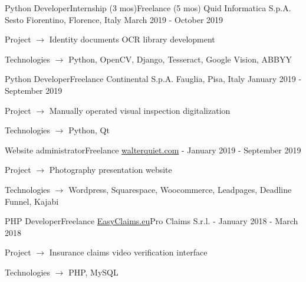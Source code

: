 
\begin{cventries}

  \cventry
    {Python Developer{\enskip\cdotp\enskip}Internship (3 mos){\enskip\cdotp\enskip}Freelance (5 mos)}
    {Quid Informatica S.p.A.}
    {Sesto Fiorentino, Florence, Italy}
    {March 2019 - October 2019}
    {
      \begin{cvitems}
        \item {Project $\rightarrow$ Identity documents OCR library development}
        \item {Technologies $\rightarrow$ Python, OpenCV, Django, Tesseract, Google Vision, ABBYY}
      \end{cvitems}
    }

  \cventry
    {Python Developer{\enskip\cdotp\enskip}Freelance}
    {Continental S.p.A.}
    {Fauglia, Pisa, Italy}
    {January 2019 - September 2019}
    {
      \begin{cvitems}
        \item {Project $\rightarrow$ Manually operated visual inspection digitalization}
        \item {Technologies $\rightarrow$ Python, Qt}
      \end{cvitems}
    }

  \cventry
    {Website administrator{\enskip\cdotp\enskip}Freelance}
    {\href{https://www.walterquiet.com}{walterquiet.com}}
    {-}
    {January 2019 - September 2019}
    {
      \begin{cvitems}
        \item {Project $\rightarrow$ Photography presentation website}
        \item {Technologies $\rightarrow$ Wordpress, Squarespace, Woocommerce, Leadpages, Deadline Funnel, Kajabi}
      \end{cvitems}
    }

  \cventry
    {PHP Developer{\enskip\cdotp\enskip}Freelance}
    {\href{https://www.easyclaims.eu}{EasyClaims.eu}{\enskip\cdotp\enskip}Pro Claims S.r.l.}
    {-}
    {January 2018 - March 2018}
    {
      \begin{cvitems}
        \item {Project $\rightarrow$ Insurance claims video verification interface}
        \item {Technologies $\rightarrow$ PHP, MySQL}
      \end{cvitems}
    }


\end{cventries}
